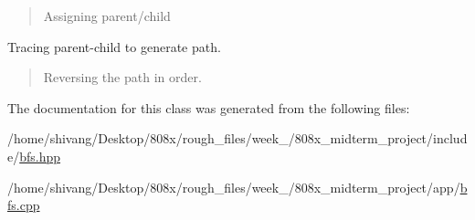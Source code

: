 \begin{quote}
Assigning parent/child \end{quote}


Tracing parent-\/child to generate path.

\begin{quote}
Reversing the path in order. \end{quote}


The documentation for this class was generated from the following files\+:\begin{DoxyCompactItemize}
\item 
/home/shivang/\+Desktop/808x/rough\+\_\+files/week\+\_/808x\+\_\+midterm\+\_\+project/include/\hyperlink{bfs_8hpp}{bfs.\+hpp}\item 
/home/shivang/\+Desktop/808x/rough\+\_\+files/week\+\_/808x\+\_\+midterm\+\_\+project/app/\hyperlink{bfs_8cpp}{bfs.\+cpp}\end{DoxyCompactItemize}

